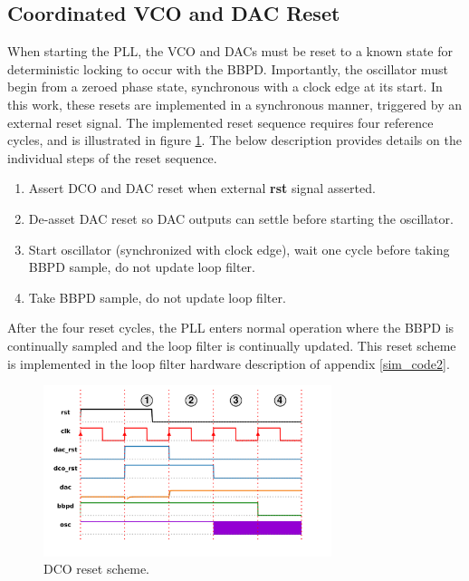 	\subsection{Coordinated VCO and DAC Reset}
	When starting the PLL, the VCO and DACs must be reset to a known state for deterministic locking to occur with the BBPD. Importantly, the oscillator must begin from a zeroed phase state, synchronous with a clock edge at its start. In this work, these resets are implemented in a synchronous manner, triggered by an external reset signal. The implemented reset sequence requires four reference cycles, and is illustrated in figure \ref{fig:dco_dac_rst}. The below description provides details on the individual steps of the reset sequence.
\begin{enumerate}[itemsep=0pt,label=\protect\mycirc{\arabic*}]
	\setlength\itemsep{-0.8em}
	\item Assert DCO and DAC reset when external \textbf{rst} signal asserted.
	\item De-asset DAC reset so DAC outputs can settle before starting the oscillator. 
	\item Start oscillator (synchronized with clock edge), wait one cycle before taking BBPD sample, do not update loop filter.
	\item Take BBPD sample, do not update loop filter.
\end{enumerate}
After the four reset cycles, the PLL enters normal operation where the BBPD is continually sampled and the loop filter is continually updated. This reset scheme is implemented in the loop filter hardware description of appendix \ref{sim_code2}.
	\begin{figure}[htb!]
	    \center\includegraphics[width=0.75\textwidth, angle=0]{figs/design/dco_dac_rst}
	    \caption{DCO reset scheme.}
	    \label{fig:dco_dac_rst}
	\end{figure}


